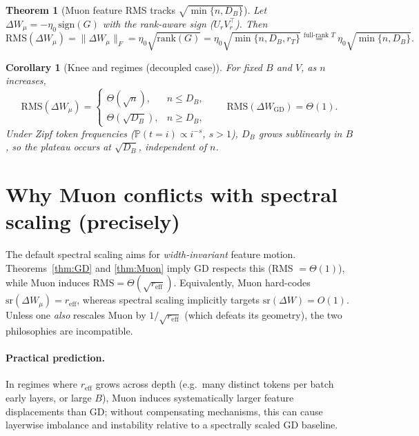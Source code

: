 \documentclass[11pt]{article}
\newtheorem{theorem}{Theorem}
\newtheorem{corollary}{Corollary}
\theoremstyle{definition}
\newcommand{\sr}{\mathrm{sr}}
\begin{document}
\begin{theorem}[Muon feature RMS tracks $\sqrt{\min\{n,D_B\}}$]\label{thm:Muon-decoupled}
Let $\Delta W_\mu=-\eta_0\,\mathrm{sign}(G)$ with the rank-aware sign ($U_rV_r^\top$). Then
\[
\mathrm{RMS}(\Delta W_\mu)=\|\Delta W_\mu\|_F=\eta_0\sqrt{\mathrm{rank}(G)}
=\eta_0\sqrt{\min\{n,D_B,r_T\}}
\stackrel{\text{full-rank }T}{=}\eta_0\sqrt{\min\{n,D_B\}}.
\]
\end{theorem}

\begin{corollary}[Knee and regimes (decoupled case)]\label{cor:knee-decoupled}
For fixed $B$ and $V$, as $n$ increases,
\[
\mathrm{RMS}(\Delta W_\mu)=
\begin{cases}
\Theta(\sqrt{n}), & n \le D_B,\\
\Theta(\sqrt{D_B}), & n \ge D_B,
\end{cases}
\qquad
\mathrm{RMS}(\Delta W_{\mathrm{GD}})=\Theta(1).
\]
Under Zipf token frequencies ($\mathbb{P}(t=i)\propto i^{-s}$, $s>1$), $D_B$ grows sublinearly in $B$, so the plateau occurs at $\sqrt{D_B}$, independent of $n$.
\end{corollary}


\section{Why Muon conflicts with spectral scaling (precisely)}

The default spectral scaling aims for \emph{width-invariant} feature motion. Theorems~\ref{thm:GD} and \ref{thm:Muon} imply GD respects this (RMS $=\Theta(1)$), while Muon induces $\mathrm{RMS}=\Theta(\sqrt{r_{\mathrm{eff}}})$. Equivalently, Muon hard-codes $\sr(\Delta W_\mu)=r_{\mathrm{eff}}$, whereas spectral scaling implicitly targets $\sr(\Delta W)=O(1)$. Unless one \emph{also} rescales Muon by $1/\sqrt{r_{\mathrm{eff}}}$ (which defeats its geometry), the two philosophies are incompatible.

\paragraph{Practical prediction.} In regimes where $r_{\mathrm{eff}}$ grows across depth (e.g.\ many distinct tokens per batch early layers, or large $B$), Muon induces systematically larger feature displacements than GD; without compensating mechanisms, this can cause layerwise imbalance and instability relative to a spectrally scaled GD baseline.
\end{document}
